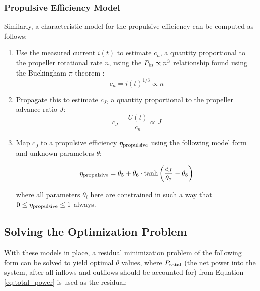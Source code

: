 \documentclass[conf]{new-aiaa}
\begin{document}
    \subsubsection{Propulsive Efficiency Model}
    \label{subsubsec:propulsive_efficiency_model}

    Similarly, a characteristic model for the propulsive efficiency can be computed as follows:

    \begin{enumerate}
        \item Use the measured current $i(t)$ to estimate $c_n$, a quantity proportional to the propeller rotational rate $n$, using the $P_{\rm in}\propto n^3$ relationship found using the Buckingham $\pi$ theorem \cite{unified_propellers}:
        \begin{equation*}
            c_n = i(t)^{1/3} \propto n
        \end{equation*}
        \item Propagate this to estimate $c_J$, a quantity proportional to the propeller advance ratio $J$:
        \begin{equation*}
            c_J = \frac{U(t)}{c_n} \propto J
        \end{equation*}
        \item Map $c_J$ to a propulsive efficiency $\eta_{\rm propulsive}$ using the following model form and unknown parameters $\theta$:

        \begin{equation*}
            \eta_{\rm propulsive} =
            \theta_5
            + \theta_6 \cdot \tanh \left(
            \frac{c_J}{\theta_7} - \theta_8
            \right)
        \end{equation*}

        \noindent where all parameters $\theta_i$ here are constrained in such a way that $0 \leq \eta_{\rm propulsive} \leq 1$ always.

    \end{enumerate}

    \subsection{Solving the Optimization Problem}
    \label{subsec:solving_optimization_problem}

    With these models in place, a residual minimization problem of the following form can be solved to yield optimal $\theta$ values, where $P_{\rm total}$ (the net power into the system, after all inflows and outflows should be accounted for) from Equation \ref{eq:total_power} is used as the residual:
\end{document}
